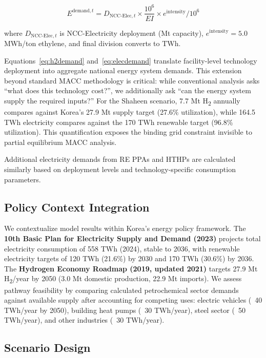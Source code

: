 \documentclass[11pt,a4paper]{article}
\begin{document}
\begin{equation}
E^{\text{demand},t} = D_{\text{NCC-Elec},t} \times \frac{10^6}{EI} \times e^{\text{intensity}} / 10^6
\label{eq:elecdemand}
\end{equation}

\noindent where $D_{\text{NCC-Elec},t}$ is NCC-Electricity deployment (Mt capacity), $e^{\text{intensity}} = 5.0$ MWh/ton ethylene, and final division converts to TWh.

Equations~\ref{eq:h2demand} and~\ref{eq:elecdemand} translate facility-level technology deployment into aggregate national energy system demands. This extension beyond standard MACC methodology is critical: while conventional analysis asks ``what does this technology cost?'', we additionally ask ``can the energy system supply the required inputs?'' For the Shaheen scenario, 7.7 Mt H\textsubscript{2} annually compares against Korea's 27.9 Mt supply target (27.6\% utilization), while 164.5 TWh electricity compares against the 170 TWh renewable target (96.8\% utilization). This quantification exposes the binding grid constraint invisible to partial equilibrium MACC analysis.

Additional electricity demands from RE PPAs and HTHPs are calculated similarly based on deployment levels and technology-specific consumption parameters.

\subsection{Policy Context Integration}

We contextualize model results within Korea's energy policy framework. The \textbf{10th Basic Plan for Electricity Supply and Demand (2023)} projects total electricity consumption of 558 TWh (2024), stable to 2036, with renewable electricity targets of 120 TWh (21.6\%) by 2030 and 170 TWh (30.6\%) by 2036. The \textbf{Hydrogen Economy Roadmap (2019, updated 2021)} targets 27.9 Mt H\textsubscript{2}/year by 2050 (3.0 Mt domestic production, 22.9 Mt imports). We assess pathway feasibility by comparing calculated petrochemical sector demands against available supply after accounting for competing uses: electric vehicles (~40 TWh/year by 2050), building heat pumps (~30 TWh/year), steel sector (~50 TWh/year), and other industries (~30 TWh/year).

\subsection{Scenario Design}
\end{document}
